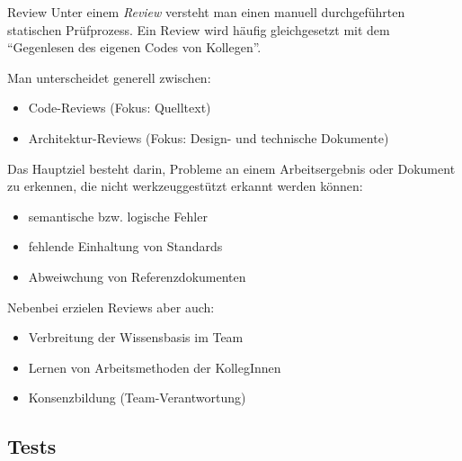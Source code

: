 \begin{defi}{Review}
    Unter einem \emph{Review} versteht man einen manuell durchgeführten statischen Prüfprozess.
    Ein Review wird häufig gleichgesetzt mit dem \enquote{Gegenlesen des eigenen Codes von Kollegen}.

    Man unterscheidet generell zwischen:
    \begin{itemize}
        \item Code-Reviews (Fokus: Quelltext)
        \item Architektur-Reviews (Fokus: Design- und technische Dokumente)
    \end{itemize}

    Das Hauptziel besteht darin, Probleme an einem Arbeitsergebnis oder Dokument zu erkennen, die nicht werkzeuggestützt erkannt werden können:
    \begin{itemize}
        \item semantische bzw. logische Fehler
        \item fehlende Einhaltung von Standards
        \item Abweiwchung von Referenzdokumenten
    \end{itemize}

    Nebenbei erzielen Reviews aber auch:
    \begin{itemize}
        \item Verbreitung der Wissensbasis im Team
        \item Lernen von Arbeitsmethoden der KollegInnen
        \item Konsenzbildung (Team-Verantwortung)
    \end{itemize}
\end{defi}

\subsection{Tests}

